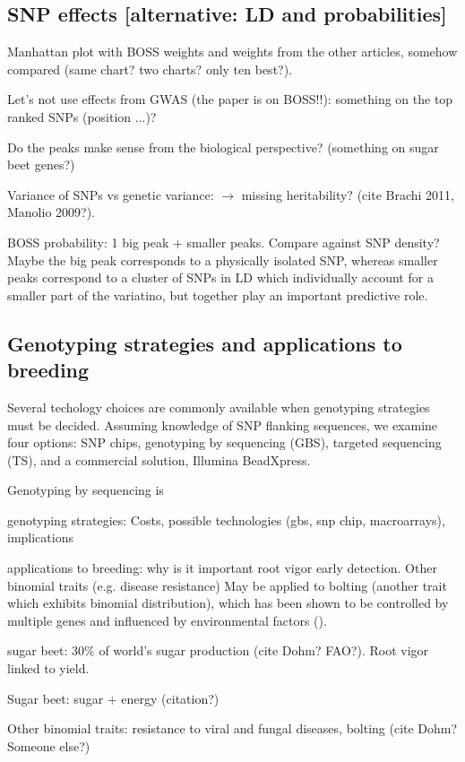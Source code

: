 \subsection{SNP effects [alternative: LD and probabilities]}
Manhattan plot with BOSS weights and weights from the other articles,
somehow compared (same chart? two charts? only ten best?).

Let's not use effects from GWAS (the paper is on BOSS!!): something on
the top ranked SNPs (position ...)?

Do the peaks make sense from the biological perspective? (something on
sugar beet genes?)

Variance of SNPs vs genetic variance: $\rightarrow$ missing
heritability? (cite Brachi 2011, Manolio 2009?).

BOSS probability: 1 big peak + smaller peaks. Compare against SNP
density? Maybe the big peak corresponds to a physically isolated SNP,
whereas smaller peaks correspond to a cluster of SNPs in LD which
individually account for a smaller part of the variatino, but together
play an important predictive role. 


\subsection{Genotyping strategies and applications to breeding}
Several techology choices are commonly available when genotyping strategies
must be decided. Assuming knowledge of SNP flanking sequences, we examine
four options: SNP chips, genotyping by sequencing (GBS), targeted sequencing (TS),
and a commercial solution, Illumina BeadXpress.


Genotyping by sequencing is 

genotyping strategies: 
Costs, possible technologies (gbs, snp chip, macroarrays), implications

applications to breeding:
why is it important root vigor early detection. Other binomial traits (e.g.
disease resistance) May be applied to bolting (another trait which
exhibits binomial distribution), which has been shown to be controlled
by multiple genes and influenced by environmental factors
(\cite{salah2012genetic}).

sugar beet: $30\%$ of world's sugar production (cite Dohm? FAO?). Root
vigor linked to yield.

Sugar beet: sugar + energy (citation?)

Other binomial traits: resistance to viral and fungal diseases, bolting
(cite Dohm? Someone else?)

